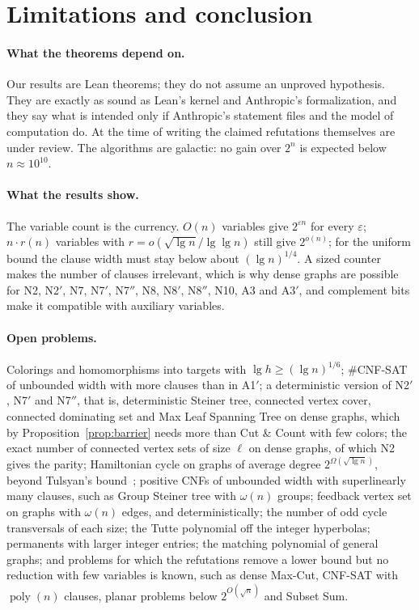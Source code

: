 \documentclass[11pt]{article}
\theoremstyle{remark}
\newcommand{\poly}{\operatorname{poly}}
\begin{document}
\section{Limitations and conclusion}\label{sec:concl}

\paragraph{What the theorems depend on.} Our results are Lean theorems; they do not assume an
unproved hypothesis. They are exactly as sound as Lean's kernel and Anthropic's formalization, and
they say what is intended only if Anthropic's statement files and the model of computation do. At
the time of writing the claimed refutations themselves are under review. The algorithms are galactic: no gain over $2^n$ is expected below
$n\approx10^{10}$.

\paragraph{What the results show.} The variable count is the currency. $O(n)$ variables give
$2^{\varepsilon n}$ for every $\varepsilon$; $n\cdot r(n)$ variables with $r=o(\sqrt{\lg n}/\lg\lg
n)$ still give $2^{o(n)}$; for the uniform bound the clause width must stay below about $(\lg
n)^{1/4}$. A sized counter makes the number of clauses irrelevant, which is why dense graphs are
possible for N2, N2$'$, N7, N7$'$, N7$''$, N8, N8$'$, N8$''$, N10, A3 and A3$'$, and complement bits make it compatible with auxiliary
variables.

\paragraph{Open problems.} Colorings and homomorphisms into targets with $\lg h\ge(\lg
n)^{1/6}$; \#CNF-SAT of unbounded width with more clauses than in A1$'$; a deterministic version of
N2$'$, N7$'$ and N7$''$, that is, deterministic Steiner tree, connected vertex cover, connected
dominating set and Max Leaf Spanning Tree on dense graphs, which by
Proposition~\ref{prop:barrier} needs more than Cut \& Count with few colors; the exact
number of connected vertex sets of size $\ell$ on dense graphs, of which N2 gives the parity;
Hamiltonian cycle on graphs of average degree $2^{\Omega(\sqrt{\lg n})}$, beyond Tulsyan's
bound~\cite{Tul26}; positive CNFs of unbounded width with superlinearly many clauses, such as Group
Steiner tree with $\omega(n)$ groups; feedback vertex set on graphs with $\omega(n)$ edges, and
deterministically; the number of odd cycle transversals of each size; the Tutte
polynomial off the integer hyperbolas; permanents with larger integer entries; the matching
polynomial of general graphs; and problems for which the refutations remove a lower bound but no
reduction with few variables is known, such as dense Max-Cut, CNF-SAT with $\poly(n)$ clauses,
planar problems below $2^{O(\sqrt n)}$ and Subset Sum.
\end{document}

